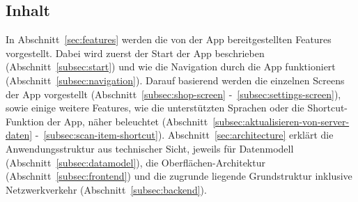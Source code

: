 \subsection{Inhalt}\label{subsec:inhalt}

In Abschnitt~\ref{sec:features} werden die von der App bereitgestellten Features vorgestellt.
Dabei wird zuerst der Start der App beschrieben (Abschnitt~\ref{subsec:start}) und wie die Navigation durch die App funktioniert (Abschnitt~\ref{subsec:navigation}).
Darauf basierend werden die einzelnen Screens der App vorgestellt (Abschnitt~\ref{subsec:shop-screen} -~\ref{subsec:settings-screen}), sowie einige weitere Features, wie die unterstützten Sprachen oder die Shortcut-Funktion der App, näher beleuchtet (Abschnitt~\ref{subsec:aktualisieren-von-server-daten} -~\ref{subsec:scan-item-shortcut}).
Abschnitt~\ref{sec:architecture} erklärt die Anwendungsstruktur aus technischer Sicht, jeweils für Datenmodell (Abschnitt~\ref{subsec:datamodel}), die Oberflächen-Architektur (Abschnitt~\ref{subsec:frontend}) und die zugrunde liegende Grundstruktur inklusive Netzwerkverkehr (Abschnitt~\ref{subsec:backend}).
